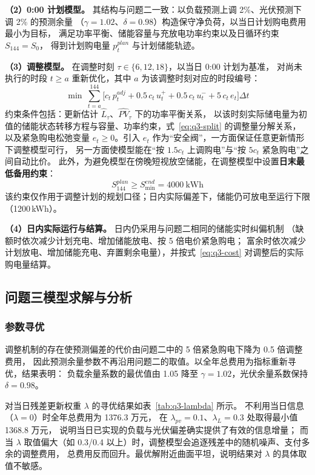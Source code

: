 \textbf{（2）0:00 计划模型。} 其结构与问题二一致：以负载预测上调 2\%、光伏预测下调 2\% 的预测余量
（$\gamma=1.02$、$\delta=0.98$）构造保守净负荷，以当日计划购电费用最小为目标，
满足功率平衡、储能容量与充放电功率约束以及日循环约束 $S_{144}=S_0$，
得到计划购电量 $p^{plan}_t$ 与计划储能轨迹。

\textbf{（3）调整模型。} 在调整时刻 $\tau\in\{6,12,18\}$，以当日 0:00 计划为基准，
对尚未执行的时段 $t\ge a$ 重新优化，其中 $a$ 为该调整时刻对应的时段编号：
\begin{equation}
\min\ \sum_{t=a}^{144}\Big[c_t\,p^{adj}_t+0.5\,c_t\,u^{+}_t+0.5\,c_t\,u^{-}_t+5\,c_t\,e_t\Big]\Delta t
\label{eq:q3-adjlp}
\end{equation}
约束条件包括：更新估计 $\widehat{L}_\tau$、$\widehat{PV}_\tau$ 下的功率平衡关系，
以该时刻实际储电量为初值的储能状态转移方程与容量、功率约束，式~\ref{eq:q3-split} 的调整量分解关系，
以及紧急购电松弛变量 $e_t\ge 0$。引入 $e_t$ 作为“安全阀”，一方面保证任意更新情形下调整模型可行，
另一方面使模型能在“按 $1.5c_t$ 上调购电”与“按 $5c_t$ 紧急购电”之间自动比价。
此外，为避免模型在傍晚短视放空储能，在调整模型中设置\textbf{日末最低备用约束}：
\begin{equation}
S^{plan}_{144}\ge S^{end}_{\min}=4000\ \text{kWh}
\label{eq:q3-end}
\end{equation}
该约束仅作用于调整计划的规划口径；日内实际偏差下，储能仍可放电至运行下限（1200\,kWh）。

\textbf{（4）日内实际运行与结算。} 日内仍采用与问题二相同的储能实时纠偏机制
（缺额时依次减少计划充电、增加储能放电、按 5 倍电价紧急购电；
富余时依次减少计划放电、增加储能充电、弃置剩余电量），并按式~\ref{eq:q3-cost} 对调整后的实际购电量结算。

\subsection{问题三模型求解与分析}

\subsubsection{参数寻优}
\label{sec:q3-param}
调整机制的存在使预测偏差的代价由问题二中的 5 倍紧急购电下降为 0.5 倍调整费用，
因此预测余量参数不再沿用问题二的取值。以全年总费用为指标重新寻优，结果表明：
负载余量系数的最优值由 1.05 降至 $\gamma=1.02$，光伏余量系数保持 $\delta=0.98$。

对当日残差更新权重 $\lambda$ 的寻优结果如表~\ref{tab:q3-lambda} 所示。
不利用当日信息（$\lambda=0$）时全年总费用为 1376.3 万元，
在 $\lambda_{pv}=0.1$、$\lambda_L=0.3$ 处取得最小值 1368.8 万元，
说明当日已实现的负载与光伏偏差确实提供了有效的信息增量；
而当 $\lambda$ 取值偏大（如 0.3/0.4 以上）时，调整模型会追逐残差中的随机噪声、支付多余的调整费用，
总费用反而回升。最优解附近曲面平坦，说明结果对 $\lambda$ 的具体取值不敏感。

